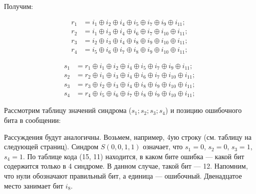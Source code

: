 \noindent
Получим:

\noindent
\begin{equation*}
    \begin{aligned}
    r_1 &= i_1 \oplus i_2 \oplus i_4  \oplus i_5 \oplus i_7 \oplus i_{9}  \oplus i_{11}; \\
    r_2 &= i_1 \oplus i_3 \oplus i_4  \oplus i_6 \oplus i_7 \oplus i_{10} \oplus i_{11}; \\
    r_3 &= i_2 \oplus i_3 \oplus i_4  \oplus i_8 \oplus i_9 \oplus i_{10} \oplus i_{11}; \\
    r_4 &= i_5 \oplus i_6 \oplus i_7  \oplus i_8 \oplus i_9 \oplus i_{10} \oplus i_{11};
    \end{aligned}
\end{equation*}

\noindent
\begin{equation*}
    \begin{aligned}
    s_1 &= r_1 \oplus i_1 \oplus i_2 \oplus i_4  \oplus i_5 \oplus i_7 \oplus i_{9}  \oplus i_{11}; \\
    s_2 &= r_2 \oplus i_1 \oplus i_3 \oplus i_4  \oplus i_6 \oplus i_7 \oplus i_{10} \oplus i_{11}; \\
    s_3 &= r_3 \oplus i_2 \oplus i_3 \oplus i_4  \oplus i_8 \oplus i_9 \oplus i_{10} \oplus i_{11}; \\
    s_4 &= r_4 \oplus i_5 \oplus i_6 \oplus i_7  \oplus i_8 \oplus i_9 \oplus i_{10} \oplus i_{11};
    \end{aligned}
\end{equation*}

Рассмотрим таблицу значений синдрома ($s_1;s_2;s_3;s_4$) и позицию ошибочного бита в сообщении:

\bigskip\noindent
Рассуждения будут аналогичны. Возьмем, например, 4ую строку (см. таблицу на следующей страниц). %
Синдром $S(0,0,1,1)$ означает, что $s_1 = 0$, $s_2 = 0$, $s_3 = 1$, $s_4 = 1$.
По таблице кода (15, 11) находится, в каком бите ошибка --- какой бит содержится только в 4 синдроме.
В данном случае, такой бит --- 12.
Напомним, что нули обозначают правильный бит, а единица --- ошибочный.
Двенадцатое место занимает бит $i_8$.

